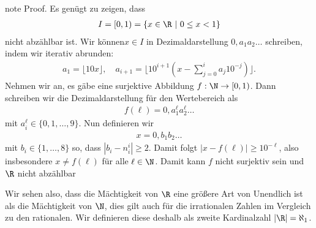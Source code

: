 \documentclass[letterpaper,10pt,english]{jupyterBook}
\begin{document}
\begin{sphinxadmonition}{note}
Proof.   Es genügt zu zeigen, dass
\begin{equation*}
\begin{split}I=[0,1) = \{ x \in \R~|~0 \leq x < 1\}\end{split}
\end{equation*}
nicht abzählbar ist. Wir können\(x \in I\) in Dezimaldarstellung \(0,a_1a_2 \ldots\) schreiben, indem wir iterativ abrunden:
\begin{equation*}
\begin{split}a_1 = \lfloor 10 x \rfloor, \quad a_{i+1} = \lfloor 10^{i+1}(x-\sum_{j=0}^i a_j 10^{-j})\rfloor.\end{split}
\end{equation*}
Nehmen wir an, es gäbe eine surjektive Abbildung \(f: \N \rightarrow [0,1)\). Dann schreiben wir die Dezimaldarstellung für den Wertebereich als
\begin{equation*}
\begin{split}f(\ell) = 0,a_1^\ell a_2^\ell \ldots\end{split}
\end{equation*}
mit \(a_i^\ell \in \{0,1,\ldots,9\}\). Nun definieren wir
\begin{equation*}
\begin{split}x=0,b_1 b_2 \ldots\end{split}
\end{equation*}
mit \(b_i \in \{1,\ldots,8\}\) so, dass \(|b_i - n_i^i| \geq 2\). Damit folgt \(|x-f(\ell)|\geq 10^{-\ell}\), also insbesondere \(x \neq f(\ell)\) für alle \(\ell \in \N\). Damit kann \(f\) nicht surjektiv sein und \(\R\) nicht abzählbar
\end{sphinxadmonition}

Wir sehen also, dass die Mächtigkeit von \(\R\) eine größere Art von Unendlich ist als die Mächtigkeit von \(\N\), dies gilt auch für die irrationalen Zahlen im Vergleich zu den rationalen. Wir definieren diese deshalb als zweite Kardinalzahl \(|\R|= \aleph_1\).
\end{document}
